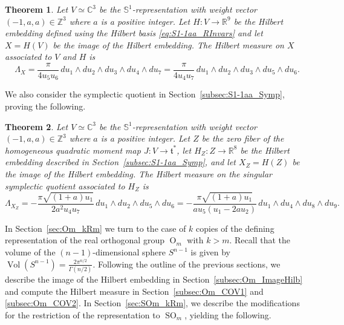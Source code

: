 \documentclass[twoside]{amsart}
\newtheorem{mainthm}{Theorem}
\theoremstyle{definition}
\theoremstyle{remark}
\numberwithin{equation}{section}
\newcommand{\C}{\mathbb{C}}
\newcommand{\Sp}{\mathbb{S}}
\newcommand{\R}{\mathbb{R}}
\newcommand{\Z}{\mathbb{Z}}
\newcommand{\OO}{\operatorname{O}}
\newcommand{\SO}{\operatorname{SO}}
\newcommand{\Vol}{\operatorname{Vol}}
\begin{document}
\begin{mainthm}
\label{mainthm:S1-1aa}
Let $V\simeq\C^3$ be the $\Sp^1$-representation with weight vector $(-1,a,a)\in\Z^3$ where $a$ is a positive integer.
Let $H\colon V\to\R^9$ be the Hilbert embedding defined using the Hilbert basis \eqref{eq:S1-1aa_RInvars} and let $X = H(V)$ be the image
of the Hilbert embedding. The Hilbert measure on $X$ associated to $V$ and $H$ is
\begin{equation}
\label{eq:Main_S1-1aa}
     \Lambda_X
     =
     \frac{\pi}{ 4 u_5 u_6 } \, du_1\wedge du_2 \wedge du_3 \wedge du_4 \wedge du_7
     =
     \frac{\pi}{ 4 u_4 u_7 } \, du_1\wedge du_2 \wedge du_3 \wedge du_5 \wedge du_6.
\end{equation}
\end{mainthm}

We also consider the symplectic quotient in Section~\ref{subsec:S1-1aa_Symp}, proving the following.

\begin{mainthm}
\label{mainthm:S1-1aa_Symp}
Let $V\simeq\C^3$ be the $\Sp^1$-representation with weight vector $(-1,a,a)\in\Z^3$ where $a$ is a positive integer.
Let $Z$ be the zero fiber of the homogeneous quadratic moment map $J\colon V\to\mathfrak{t}^\ast$,
let $H_Z\colon Z\to\R^8$ be the Hilbert embedding described in Section~\ref{subsec:S1-1aa_Symp}, and let $X_Z = H(Z)$ be the image
of the Hilbert embedding. The Hilbert measure on the singular symplectic quotient associated to $H_Z$ is
\begin{equation}
\label{eq:Main_S1-1aa_Symp}
    \Lambda_{X_Z}
    =
    - \frac{\pi \sqrt{ (1 + a) u_1 } }
        { 2 a^2 u_4 u_7 }
        \, du_1\wedge du_2 \wedge du_5 \wedge du_6        
    =
    - \frac{\pi \sqrt{ (1 + a) u_1 } }
        { a u_5 (u_1 - 2a u_2) }
        \, du_1\wedge du_4 \wedge du_8 \wedge du_9.
\end{equation}
\end{mainthm}

In Section~\ref{sec:Om_kRm} we turn to the case of $k$ copies of the defining representation of the real orthogonal group $\OO_m$ with $k > m$.
Recall that the volume of the $(n-1)$-dimensional sphere $S^{n-1}$ is given by $\Vol(S^{n-1}) = \frac{2\pi^{n/2}}{\Gamma(n/2)}$.
Following the outline of the previous sections, we describe the image of the Hilbert embedding in Section~\ref{subsec:Om_ImageHilb}
and compute the Hilbert measure in Section~\ref{subsec:Om_COV1} and \ref{subsec:Om_COV2}. In Section~\ref{sec:SOm_kRm}, we describe the modifications
for the restriction of the representation to $\SO_m$, yielding the following.
\end{document}
